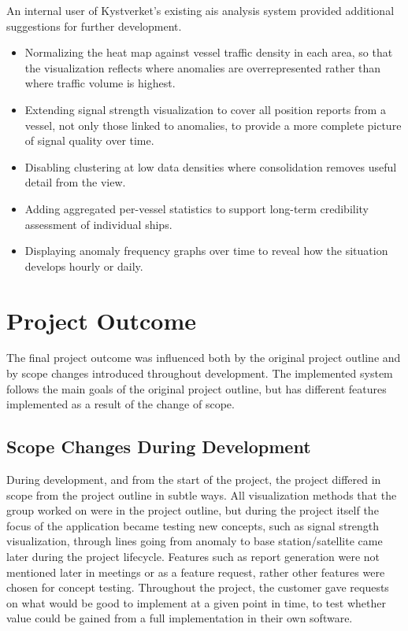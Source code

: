 An internal user of Kystverket's existing \acrshort{ais} analysis system provided additional suggestions for further development.

\begin{itemize}
  \item Normalizing the heat map against vessel traffic density in
    each area, so that the visualization reflects where anomalies are
    overrepresented rather than where traffic volume is highest.
  \item Extending signal strength visualization to cover all position
    reports from a vessel, not only those linked to anomalies, to
    provide a more complete picture of signal quality over time.
  \item Disabling clustering at low data densities where
    consolidation removes useful detail from the view.
  \item Adding aggregated per-vessel statistics to support long-term
    credibility assessment of individual ships.
  \item Displaying anomaly frequency graphs over time to reveal how
    the situation develops hourly or daily.
\end{itemize}

\section{Project Outcome}

The final project outcome was influenced both by the original project outline and by scope changes introduced throughout development. The implemented system follows the main goals of the original project outline, but has different features implemented as a result of the change of scope.

\subsection{Scope Changes During Development}

During development, and from the start of the project, the project differed in scope from the project outline in subtle ways. All visualization methods that the group worked on were in the project outline, but during the project itself the focus of the application became testing new concepts, such as signal strength visualization, through lines going from anomaly to base station/satellite came later during the project lifecycle. Features such as report generation were not mentioned later in meetings or as a feature request, rather other features were chosen for concept testing. Throughout the project, the customer gave requests on what would be good to implement at a given point in time, to test whether value could be gained from a full implementation in their own software.

